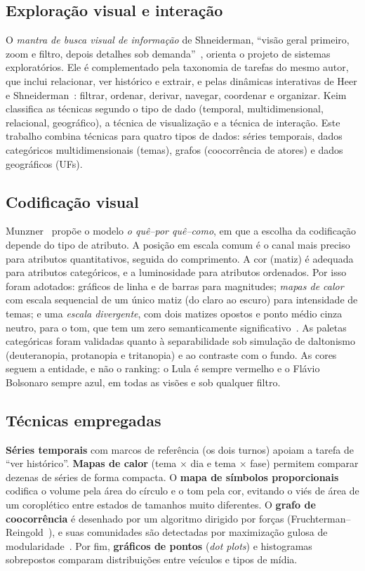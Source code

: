 \documentclass[conference]{IEEEtran}
\begin{document}
\subsection{Exploração visual e interação}
O \emph{mantra de busca visual de informação} de Shneiderman, ``visão geral primeiro, zoom e filtro, depois detalhes sob demanda''~\cite{shneiderman1996}, orienta o projeto de sistemas exploratórios. Ele é complementado pela taxonomia de tarefas do mesmo autor, que inclui relacionar, ver histórico e extrair, e pelas dinâmicas interativas de Heer e Shneiderman~\cite{heer2012}: filtrar, ordenar, derivar, navegar, coordenar e organizar. Keim~\cite{keim2002} classifica as técnicas segundo o tipo de dado (temporal, multidimensional, relacional, geográfico), a técnica de visualização e a técnica de interação. Este trabalho combina técnicas para quatro tipos de dados: séries temporais, dados categóricos multidimensionais (temas), grafos (coocorrência de atores) e dados geográficos (UFs).

\subsection{Codificação visual}
Munzner~\cite{munzner2014} propõe o modelo \emph{o quê--por quê--como}, em que a escolha da codificação depende do tipo de atributo. A posição em escala comum é o canal mais preciso para atributos quantitativos, seguida do comprimento. A cor (matiz) é adequada para atributos categóricos, e a luminosidade para atributos ordenados. Por isso foram adotados: gráficos de linha e de barras para magnitudes; \emph{mapas de calor} com escala sequencial de um único matiz (do claro ao escuro) para intensidade de temas; e uma \emph{escala divergente}, com dois matizes opostos e ponto médio cinza neutro, para o tom, que tem um zero semanticamente significativo~\cite{harrower2003}. As paletas categóricas foram validadas quanto à separabilidade sob simulação de daltonismo (deuteranopia, protanopia e tritanopia) e ao contraste com o fundo. As cores seguem a entidade, e não o ranking: o Lula é sempre vermelho e o Flávio Bolsonaro sempre azul, em todas as visões e sob qualquer filtro.

\subsection{Técnicas empregadas}
\textbf{Séries temporais} com marcos de referência (os dois turnos) apoiam a tarefa de ``ver histórico''. \textbf{Mapas de calor} (tema $\times$ dia e tema $\times$ fase) permitem comparar dezenas de séries de forma compacta. O \textbf{mapa de símbolos proporcionais} codifica o volume pela área do círculo e o tom pela cor, evitando o viés de área de um coroplético entre estados de tamanhos muito diferentes. O \textbf{grafo de coocorrência} é desenhado por um algoritmo dirigido por forças (Fruchterman--Reingold~\cite{fruchterman1991}), e suas comunidades são detectadas por maximização gulosa de modularidade~\cite{clauset2004}. Por fim, \textbf{gráficos de pontos} (\emph{dot plots}) e histogramas sobrepostos comparam distribuições entre veículos e tipos de mídia.
\end{document}
